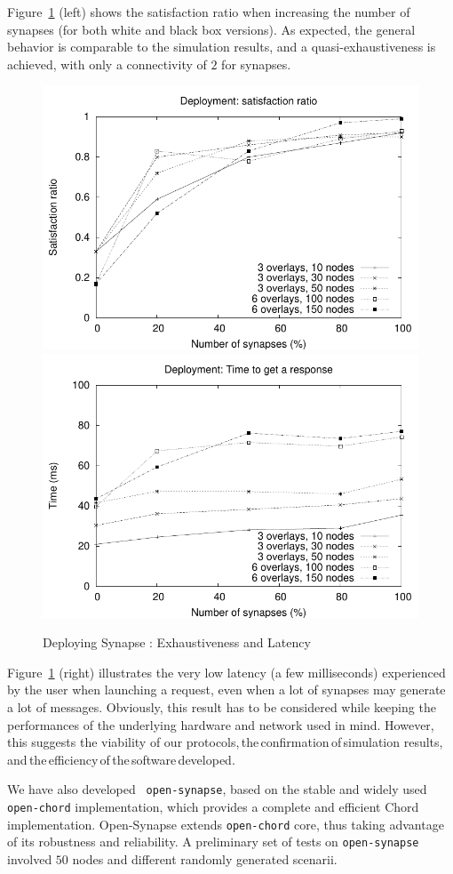 Figure~\ref{dep:1-sat} (left) shows the satisfaction ratio when
increasing the number of synapses (for both white and black box
versions). As expected, the general behavior is comparable to the
simulation results, and a quasi-exhaustiveness is achieved, with only
a connectivity of $2$ for synapses.
%
\begin{figure}[!t]
  \includegraphics[width=0.5\linewidth]{fig/dep1-sat.pdf}
  \includegraphics[width=0.5\linewidth]{fig/dep1-time.pdf}
  \caption{Deploying Synapse : Exhaustiveness and Latency \label{dep:1-sat}}
\end{figure}
%
Figure~\ref{dep:1-sat} (right) illustrates the very low latency (a few
milliseconds) experienced by the user when launching a request, even
when a lot of synapses may generate a lot of messages. Obviously, this
result has to be considered while keeping the performances of the
underlying hardware and network used in mind. However, this suggests
the viability of our protocols,\,the\,confirmation\,of\,simulation
results,\,and\,the\,efficiency\,of\,the\,software\,developed.
%

%
 We have also developed {\tt
  open-synapse}, based on the stable and widely used {\tt open-chord}
implementation, which provides a complete and efficient Chord
implementation. Open-Synapse extends {\tt open-chord} core,  thus
taking advantage of its robustness and reliability. A preliminary set
of tests on {\tt open-synapse} involved $50$ nodes and different
randomly generated scenarii.
